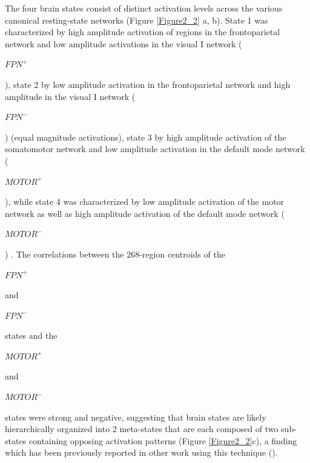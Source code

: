 \documentclass[phd,tocprelim]{cornell}
\begin{document}
    The four brain states consist of distinct activation levels across the various canonical resting-state networks (Figure \ref{Figure2_2} a, b). State 1 was characterized by high amplitude activation of regions in the frontoparietal network and low amplitude activations in the visual I network (\begin{Large}$FPN^+$\end{Large}), state 2 by low amplitude activation in the frontoparietal network and high amplitude in the visual I network (\begin{Large}$FPN^-$\end{Large}) (equal magnitude activations), state 3 by high amplitude activation of the somatomotor network and low amplitude activation in the default mode network (\begin{Large}$MOTOR^+$\end{Large}), while state 4 was characterized by low amplitude activation of the motor network as well as high amplitude activation of the default mode network (\begin{Large}$MOTOR^-$\end{Large}) . The correlations between the 268-region centroids of the \begin{Large}$FPN^+$\end{Large} and \begin{Large}$FPN^-$\end{Large} states and the \begin{Large}$MOTOR^+$\end{Large} and \begin{Large}$MOTOR^-$\end{Large} states were strong and negative, suggesting that brain states are likely hierarchically organized into 2 meta-states that are each composed of two sub-states containing opposing activation patterns (Figure \ref{Figure2_2}c), a finding which has been previously reported in other work using this technique (\cite{Singleton2022-jq}).
    
\end{document}
